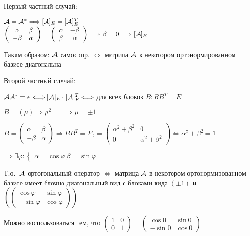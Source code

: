 \notice

Первый частный случай:

    $\mathcal{A} = \mathcal{A}^* \Longrightarrow [\mathcal{A}]_{E} = [\mathcal{A}]^T_{E}$ \\
    $\left(\begin{array}{cc}
    \alpha & \beta \\ 
    -\beta & \alpha
    \end{array}\right) = \left(\begin{array}{cc}
    \alpha & -\beta \\ 
    \beta & \alpha
    \end{array}\right) \Longrightarrow \beta = 0 \Longrightarrow [\mathcal{A}]_{E}$

    Таким образом: $\mathcal{A}$ самосопр. $\Longleftrightarrow$ матрица $\mathcal{A}$ в некотором ортонормированном базисе диагональна

Второй частный случай:

    $\mathcal{A} \mathcal{A}^* = \epsilon$ %
    $\Longleftrightarrow [\mathcal{A}]_{E} \cdot [\mathcal{A}]^T_{E} \Longleftrightarrow $ для всех блоков $B: BB^T = E_{\dots}$

    $B = (\mu) \Longrightarrow \mu^2 = 1 \Longrightarrow \mu = \pm 1$

    $B = \left(\begin{array}{cc}
    \alpha & \beta \\ 
    -\beta & \alpha
    \end{array}\right) \Longrightarrow BB^T = E_2 = \left(\begin{array}{cc}
    \alpha^2 + \beta^2 & 0 \\ 
    0 & \alpha^2 + \beta^2
    \end{array}\right) \Longleftrightarrow \alpha^2 + \beta^2 = 1$

$ \Longrightarrow \exists \varphi : \begin{cases}
    \alpha = \cos{\varphi} \
    \beta = \sin{\varphi}
\end{cases} $

Т.о.: $\mathcal{A}$ ортогональный оператор $\Longleftrightarrow$ матрица $\mathcal{A}$ в некотором ортонормированном базисе имеет блочно-диагональный вид с блоками вида $(\pm 1)$ и $( \left(\begin{array}{cc}
\cos{\varphi} & \sin{\varphi} \\ 
-\sin{\varphi} & \cos{\varphi}
\end{array}\right) )$

Можно воспользоваться тем, что $\left(\begin{array}{cc}
1 & 0 \\ 
0 & 1
\end{array}\right) = \left(\begin{array}{cc}
\cos{0} & \sin{0} \\ 
-\sin{0} & \cos{0}
\end{array}\right)$

